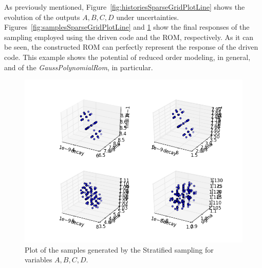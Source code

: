  As previously mentioned, Figure~\ref{fig:historiesSparseGridPlotLine} 
 shows the evolution of the outputs $A,B,C,D$ under uncertainties. 
 Figures~\ref{fig:samplesSparseGridPlotLine} and 
 \ref{fig:samplesROMSparseGridPlotLine} show the final responses 
 of the sampling employed using the driven code and the ROM, 
 respectively. As it can be seen, the constructed ROM can perfectly
 represent the response of the driven code. This example shows the
 potential of reduced order modeling, in general, and of the 
 \textit{GaussPolynomialRom}, in particular.
 
 \begin{figure}[h!]
  \centering
  \includegraphics[scale=0.7]{pics/samplesROM_SparseGrid.png}
  \caption{Plot of the samples generated by the Stratified sampling for variables $A,B,C,D$.}
  \label{fig:samplesROMSparseGridPlotLine}
 \end{figure}








